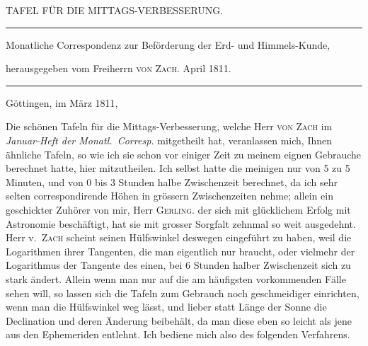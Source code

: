 \clearpage{}%
\begin{center}
{\small TAFEL FÜR DIE MITTAGS-VERBESSERUNG.\par}
\medskip\hrule\medskip
{\small Monatliche Correspondenz zur Beförderung der Erd- und Himmels-Kunde,\par
herausgegeben vom Freiherrn \textsc{von Zach}. April 1811.\par}
\medskip\hrule
\end{center}\medskip
\begin{flushright}Göttingen, im März 1811,\end{flushright}
Die schönen Tafeln für die Mittags-Verbesserung, welche Herr \textsc{von Zach} im \emph{Januar-Heft der Monatl.\ Corresp.} mitgetheilt hat, veranlassen mich, Ihnen ähnliche Tafeln, so wie ich sie schon vor einiger Zeit zu meinem eignen Gebrauche berechnet hatte, hier mitzutheilen. Ich selbst hatte die meinigen nur von 5 zu 5 Minuten, und von 0 bis 3 Stunden halbe Zwischenzeit berechnet, da ich sehr selten correspondirende Höhen in grössern Zwischenzeiten nehme; allein ein geschickter Zuhörer von mir, Herr \textsc{Gerling}. der sich mit glücklichem Erfolg mit Astronomie beschäftigt, hat sie mit grosser Sorgfalt zehnmal so weit ausgedehnt. Herr v.\ \textsc{Zach} scheint seinen Hülfswinkel deswegen eingeführt zu haben, weil die Logarithmen ihrer Tangenten, die man eigentlich nur braucht, oder vielmehr der Logarithmus der Tangente des einen, bei 6 Stunden halber Zwischenzeit sich zu stark ändert. Allein wenn man nur auf die am häufigsten vorkommenden Fälle sehen will, so lassen sich die Tafeln zum Gebrauch noch geschmeidiger einrichten, wenn man die Hülfswinkel weg lässt, und lieber statt Länge der Sonne die Declination und deren Änderung beibehält, da man diese eben so leicht als jene aus den Ephemeriden entlehnt. Ich bediene mich also des folgenden Verfahrens.
%

